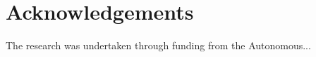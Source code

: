 \section{Acknowledgements} \label{sec:acknowledgements}
The research was undertaken through funding from the Autonomous...